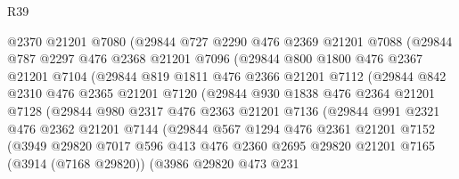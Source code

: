 \begin{lexlean}{R39}
\begin{coremodule}
              @2370
              @21201
              @7080
              (@29844
                @727
                @2290
                @476
                @2369
                @21201
                @7088
                (@29844
                  @787
                  @2297
                  @476
                  @2368
                  @21201
                  @7096
                  (@29844
                    @800
                    @1800
                    @476
                    @2367
                    @21201
                    @7104
                    (@29844
                      @819
                      @1811
                      @476
                      @2366
                      @21201
                      @7112
                      (@29844
                        @842
                        @2310
                        @476
                        @2365
                        @21201
                        @7120
                        (@29844
                          @930
                          @1838
                          @476
                          @2364
                          @21201
                          @7128
                          (@29844
                            @980
                            @2317
                            @476
                            @2363
                            @21201
                            @7136
                            (@29844
                              @991
                              @2321
                              @476
                              @2362
                              @21201
                              @7144
                              (@29844
                                @567
                                @1294
                                @476
                                @2361
                                @21201
                                @7152
                                (@3949
                                  @29820
                                  @7017
                                  @596
                                  @413
                                  @476
                                  @2360
                                  @2695
                                  @29820
                                  @21201
                                  @7165
                                  (@3914 (@7168 @29820))
                                  (@3986
                                    @29820
                                    @473
                                    @231

\end{coremodule}
\end{lexlean}
